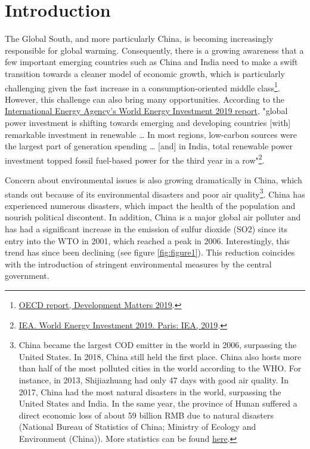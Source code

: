 \documentclass[12pt]{article}
\begin{document}
\doublespacing

\section{Introduction} \label{sec:introduction}

The Global South, and more particularly China, is becoming increasingly responsible for global warming. Consequently, there is a growing awareness that a few important emerging countries such as China and India need to make a swift transition towards a cleaner model of economic growth, which is particularly challenging given the fast increase in a consumption-oriented middle class\footnote{ \href{https://oecd-development-matters.org/2019/06/20/the-global-souths-contribution-to-the-climate-crisis-and-its-potential-solutions/}{OECD report, Development Matters 2019}.}. However, this challenge can also bring many opportunities. According to the \href{https://www.iea.org/wei2019/}{International Energy Agency’s World Energy Investment 2019 report}, "global power investment is shifting towards emerging and developing countries [with] remarkable investment in renewable … In most regions, low-carbon sources were the largest part of generation spending … [and] in India, total renewable power investment topped fossil fuel-based power for the third year in a row"\footnote{ \href{https://drive.google.com/open?id=16ftB1MMwn9drPqVb1b5O51ODzhPQjiW-}{IEA. World Energy Investment 2019. Paris: IEA, 2019}.}.

Concern about environmental issues is also growing dramatically in China, which stands out because of its environmental disasters and poor air quality\footnote{China became the largest COD emitter in the world in 2006, surpassing the United States. In 2018, China still held the first place. China also hosts more than half of the most polluted cities in the world according to the WHO. For instance, in 2013, Shijiazhuang had only 47 days with good air quality. In 2017, China had the most natural disasters in the world, surpassing the United States and India. In the same year, the province of Hunan suffered a direct economic loss of about 59 billion RMB due to natural disasters (National Bureau of Statistics of China; Ministry of Ecology and
Environment (China)). More statistics can be found \href{https://drive.google.com/open?id=1nq-njkZ-TaQyzH30Ncq1R8hlpFE1InSG}{here}.
}. China has experienced numerous disasters, which impact the health of the population and nourish political discontent. In addition, China is a major global air polluter and has had a significant increase in the emission of sulfur dioxide (SO2) since its entry into the WTO in 2001, which reached a peak in 2006. Interestingly, this trend has since been declining (see figure \ref{fig:figure1}). This reduction coincides with the introduction of stringent environmental measures by the central government.
\end{document}
